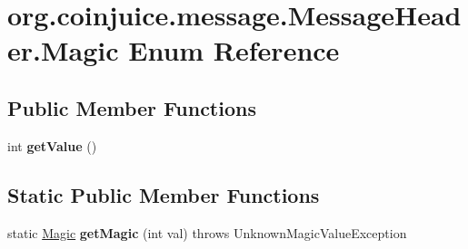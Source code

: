 \hypertarget{enumorg_1_1coinjuice_1_1message_1_1_message_header_1_1_magic}{\section{org.\-coinjuice.\-message.\-Message\-Header.\-Magic Enum Reference}
\label{enumorg_1_1coinjuice_1_1message_1_1_message_header_1_1_magic}
}
\subsection*{Public Member Functions}
\begin{DoxyCompactItemize}
\item 
\hypertarget{enumorg_1_1coinjuice_1_1message_1_1_message_header_1_1_magic_a2172179d716d6483ed2d7a19ec0a905f}{int {\bfseries get\-Value} ()}\label{enumorg_1_1coinjuice_1_1message_1_1_message_header_1_1_magic_a2172179d716d6483ed2d7a19ec0a905f}

\end{DoxyCompactItemize}
\subsection*{Static Public Member Functions}
\begin{DoxyCompactItemize}
\item 
\hypertarget{enumorg_1_1coinjuice_1_1message_1_1_message_header_1_1_magic_a52c7aa6fc3c0ea10df984e2b19dc0e46}{static \hyperlink{enumorg_1_1coinjuice_1_1message_1_1_message_header_1_1_magic}{Magic} {\bfseries get\-Magic} (int val)  throws Unknown\-Magic\-Value\-Exception }\label{enumorg_1_1coinjuice_1_1message_1_1_message_header_1_1_magic_a52c7aa6fc3c0ea10df984e2b19dc0e46}

\end{DoxyCompactItemize}
